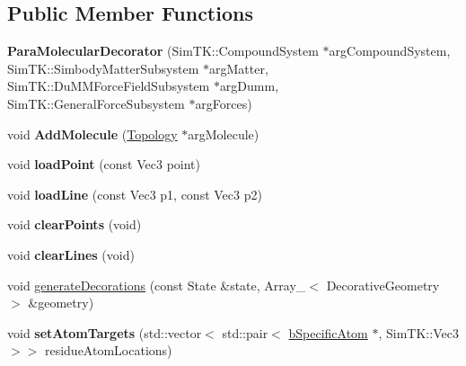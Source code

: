 \subsection*{Public Member Functions}
\begin{DoxyCompactItemize}
\item 
{\bfseries Para\+Molecular\+Decorator} (Sim\+T\+K\+::\+Compound\+System $\ast$arg\+Compound\+System, Sim\+T\+K\+::\+Simbody\+Matter\+Subsystem $\ast$arg\+Matter, Sim\+T\+K\+::\+Du\+M\+M\+Force\+Field\+Subsystem $\ast$arg\+Dumm, Sim\+T\+K\+::\+General\+Force\+Subsystem $\ast$arg\+Forces)\hypertarget{classParaMolecularDecorator_a00ee22ac14c9bd33771b4006bcae55e5}{}\label{classParaMolecularDecorator_a00ee22ac14c9bd33771b4006bcae55e5}

\item 
void {\bfseries Add\+Molecule} (\hyperlink{classTopology}{Topology} $\ast$arg\+Molecule)\hypertarget{classParaMolecularDecorator_a23ac037154120e14574aeed3e5a300b6}{}\label{classParaMolecularDecorator_a23ac037154120e14574aeed3e5a300b6}

\item 
void {\bfseries load\+Point} (const Vec3 point)\hypertarget{classParaMolecularDecorator_aef3764d8a79b7a888be38db7c4715529}{}\label{classParaMolecularDecorator_aef3764d8a79b7a888be38db7c4715529}

\item 
void {\bfseries load\+Line} (const Vec3 p1, const Vec3 p2)\hypertarget{classParaMolecularDecorator_a13cdd8929af06e78706d43a80cdde877}{}\label{classParaMolecularDecorator_a13cdd8929af06e78706d43a80cdde877}

\item 
void {\bfseries clear\+Points} (void)\hypertarget{classParaMolecularDecorator_a75516eeec18b6629281fffe64c6e33e2}{}\label{classParaMolecularDecorator_a75516eeec18b6629281fffe64c6e33e2}

\item 
void {\bfseries clear\+Lines} (void)\hypertarget{classParaMolecularDecorator_aeca0898301083dfdb525e3d65306de65}{}\label{classParaMolecularDecorator_aeca0898301083dfdb525e3d65306de65}

\item 
void \hyperlink{classParaMolecularDecorator_a9d92eb6838610d91b6933dffd415e061}{generate\+Decorations} (const State \&state, Array\+\_\+$<$ Decorative\+Geometry $>$ \&geometry)
\item 
void {\bfseries set\+Atom\+Targets} (std\+::vector$<$ std\+::pair$<$ \hyperlink{classbSpecificAtom}{b\+Specific\+Atom} $\ast$, Sim\+T\+K\+::\+Vec3 $>$$>$ residue\+Atom\+Locations)\hypertarget{classParaMolecularDecorator_a8d4f8fd75c3e98b2f94778d1139e302a}{}\label{classParaMolecularDecorator_a8d4f8fd75c3e98b2f94778d1139e302a}

\end{DoxyCompactItemize}


